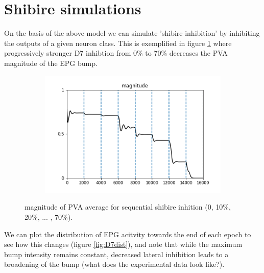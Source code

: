 \documentclass{article}
\begin{document}
\newpage

\section*{Shibire simulations}

On the basis of the above model we can simulate 'shibire inhibition' by inhibiting the outputs of a given neuron class. This is exemplified in figure \ref{fig:seqshi} where progressively stronger D7 inhibtion from 0\% to 70\% decreases the PVA magnitude of the EPG bump.

\begin{figure}[h]
	\centering
	\begin{subfigure}[t]{0.63\linewidth}
		\centering
		\includegraphics[width = 1.0\linewidth, trim={0 0 0 0}, clip=true]{../figures/D7_sequential_mags.png}
	\end{subfigure}
	\hspace{0.1\linewidth}
\caption{magnitude of PVA average  for sequential shibire inhition (0, 10\%, 20\%, ... , 70\%).}
\label{fig:seqshi}
\end{figure}

We can plot the distribution of EPG acitvity towards the end of each epoch to see how this changes (figure \ref{fig:D7dist}), and note that while the maximum bump intensity remains constant, decreased lateral inhibition leads to a broadening of the bump (what does the experimental data look like?).
\end{document}
